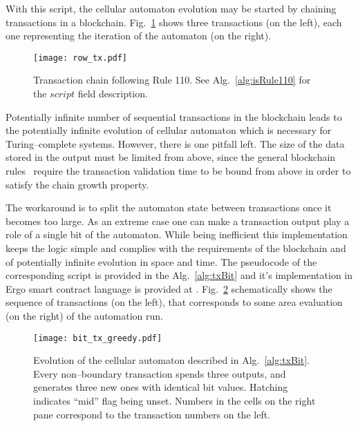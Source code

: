 \documentclass[runningheads]{llncs}
\begin{document}
    With this script, the cellular automaton evolution may be started by
    chaining transactions in a blockchain. Fig.~\ref{fig:txs} shows three
    transactions (on the left), each one representing the iteration of the
    automaton (on the right).

    \begin{figure}[h]
        \centering
        \texttt{[image: row\_tx.pdf]}
        \caption{Transaction chain following Rule 110. See
            Alg.~\ref{alg:isRule110} for the
            $script$ field description.
        \label{fig:txs} }
    \end{figure}
    Potentially infinite number of sequential transactions in the blockchain
    leads to the potentially infinite evolution of cellular automaton which is
    necessary for Turing--complete systems.  However, there is one pitfall left.
    The size of the data stored in the output must be limited from above, since
    the general blockchain rules~\cite{garay2015bitcoin} require the transaction
    validation time to be bound from above in order to satisfy the chain growth
    property.

    The workaround is to split the automaton state between
    transactions once it becomes too large. As an extreme case one can make a
    transaction output play a role of a single bit of the automaton. While being
    inefficient this implementation keeps the logic simple and complies with the
    requirements of the blockchain and of potentially infinite evolution in
    space and time. The pseudocode of the corresponding script is
    provided in the Alg.~\ref{alg:txBit} and it's implementation in Ergo smart
    contract language is provided at \cite{ergoScript2}. Fig.~\ref{fig:bit_txs}
    schematically shows the sequence of transactions (on the left), that corresponds
    to some area evaluation (on the right) of the automation run.
    \begin{figure}[h]
        \centering
        \texttt{[image: bit\_tx\_greedy.pdf]}
        \caption{Evolution of the cellular automaton described in
            Alg.~\ref{alg:txBit}. Every non--boundary transaction spends three
            outputs, and generates three new ones with identical bit values.
            Hatching indicates ``mid'' flag being unset. Numbers in the cells on
            the right pane correspond to the transaction numbers on the left.
        \label{fig:bit_txs} }
    \end{figure}
    
\end{document}
